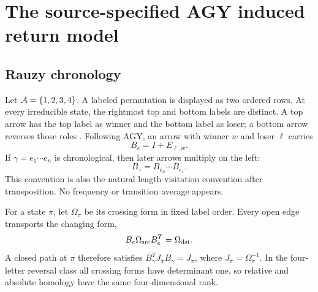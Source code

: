 \section{The source-specified AGY induced return model}
\label{sec:model}

\subsection{Rauzy chronology}

Let \(\mathcal A=\{1,2,3,4\}\).  A labeled permutation is displayed as two ordered
rows.  At every irreducible state, the rightmost top and bottom labels are
distinct.  A top arrow has the top label as winner and the bottom label as
loser; a bottom arrow reverses those roles
\citep{yoccoz2010}.  Following AGY, an arrow with
winner \(w\) and loser \(\ell\) carries
\begin{equation}
 B_e=I+E_{\ell,w}.
 \label{eq:edge-matrix}
\end{equation}
If \(\gamma=e_1\cdots e_n\) is chronological, then later arrows multiply on
the left:
\begin{equation}
 B_\gamma=B_{e_n}\cdots B_{e_1}.
 \label{eq:chronology}
\end{equation}
This convention is also the natural length-visitation convention after
transposition.  No frequency or transition average appears.

For a state \(\pi\), let \(\Omega_\pi\) be its crossing form in fixed label
order.  Every open edge transports the changing form,
\begin{equation}
 B_e\Omega_{\rm src}B_e^T=\Omega_{\rm dst}.
 \label{eq:form-transport}
\end{equation}
A closed path at \(\pi\) therefore satisfies
\(B_\gamma^TJ_\pi B_\gamma=J_\pi\), where
\(J_\pi=\Omega_\pi^{-1}\).  In the four-letter reversal class all crossing
forms have determinant one, so relative and absolute homology have the same
four-dimensional rank.

